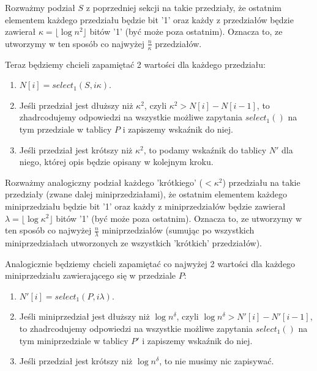 \documentclass{article}
\begin{document}
Rozważmy podział $S$ z poprzedniej sekcji na takie przedziały, że ostatnim elementem każdego przedziału będzie bit '1' oraz każdy z przedziałów będzie zawierał $\kappa = \lfloor \log{n}^2 \rfloor$ bitów '1' (być może poza ostatnim). Oznacza to, ze utworzymy w ten sposób co najwyżej $\frac{n}{\kappa}$ przedziałów.

Teraz będziemy chcieli zapamiętać 2 wartości dla każdego przedziału:
\begin{enumerate}
    \item $N[i] = select_1(S, i\kappa)$.
    \item Jeśli przedział jest dłuższy niż $\kappa^2$, czyli $\kappa^2 > N[i] - N[i-1]$, to zhadrcodujemy odpowiedzi na wszystkie możliwe zapytania $select_1()$ na tym przedziale w tablicy $P$ i zapiszemy wskaźnik do niej.
    \item Jeśli przedział jest krótszy niż $\kappa^2$, to podamy wskaźnik do tablicy $N'$ dla niego, której opis będzie opisany w kolejnym kroku.
\end{enumerate}

Rozważmy analogiczny podział każdego 'krótkiego' ($< \kappa^2$) przedziału na takie przedziały (zwane dalej miniprzedziałami), że ostatnim elementem każdego miniprzedziału będzie bit '1' oraz każdy z miniprzedziałów będzie zawierał $\lambda = \lfloor \log{\kappa}^2 \rfloor$ bitów '1' (być może poza ostatnim). Oznacza to, ze utworzymy w ten sposób co najwyżej $\frac{n}{\lambda}$ miniprzedziałów (sumując po wszystkich miniprzedziałach utworzonych ze wszystkich 'krótkich' przedziałów).

Analogicznie będziemy chcieli zapamiętać co najwyżej 2 wartości dla każdego miniprzedziału zawierającego się w przedziale $P$:
\begin{enumerate}
    \item $N'[i] = select_1(P, i\lambda)$.
    \item Jeśli miniprzedział jest dłuższy niż $\log{n}^{\delta}$, czyli $\log{n}^{\delta} > N'[i] - N'[i-1]$, to zhadrcodujemy odpowiedzi na wszystkie możliwe zapytania $select_1()$ na tym miniprzedziale w tablicy $P'$ i zapiszemy wskaźnik do niej.
    \item Jeśli przedział jest krótszy niż $\log{n}^{\delta}$, to nie musimy nic zapisywać.
\end{enumerate}

\end{document}

